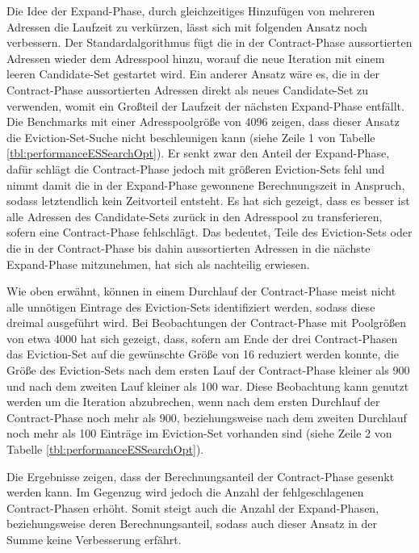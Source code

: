 Die Idee der Expand-Phase, durch gleichzeitiges Hinzufügen von mehreren Adressen die Laufzeit zu verkürzen, lässt sich mit folgenden Ansatz noch verbessern.
Der Standardalgorithmus fügt die in der Contract-Phase aussortierten Adressen wieder dem Adresspool hinzu, worauf die neue Iteration mit einem leeren Candidate-Set gestartet wird.
Ein anderer Ansatz wäre es, die in der Contract-Phase aussortierten Adressen direkt als neues Candidate-Set zu verwenden, womit ein Großteil der Laufzeit der nächsten Expand-Phase entfällt.
Die Benchmarks mit einer Adresspoolgröße von 4096 zeigen, dass dieser Ansatz die Eviction-Set-Suche nicht beschleunigen kann (siehe Zeile 1 von Tabelle \ref{tbl:performanceESSearchOpt}).
Er senkt zwar den Anteil der Expand-Phase, dafür schlägt die Contract-Phase jedoch mit größeren Eviction-Sets fehl und nimmt damit die in der Expand-Phase gewonnene Berechnungszeit in Anspruch, sodass letztendlich kein Zeitvorteil entsteht.
Es hat sich gezeigt, dass es besser ist alle Adressen des Candidate-Sets zurück in den Adresspool zu transferieren, sofern eine Contract-Phase fehlschlägt.
Das bedeutet, Teile des Eviction-Sets oder die in der Contract-Phase bis dahin aussortierten Adressen in die nächste Expand-Phase mitzunehmen, hat sich als nachteilig erwiesen.


Wie oben erwähnt, können in einem Durchlauf der Contract-Phase meist nicht alle unnötigen Eintrage des Eviction-Sets identifiziert werden, sodass diese dreimal ausgeführt wird.
Bei Beobachtungen der Contract-Phase mit Poolgrößen von etwa 4000 hat sich gezeigt, dass, sofern am Ende der drei Contract-Phasen das Eviction-Set auf die gewünschte Größe von 16 reduziert werden konnte, die Größe des Eviction-Sets nach dem ersten Lauf der Contract-Phase kleiner als 900 und nach dem zweiten Lauf kleiner als 100 war.
Diese Beobachtung kann genutzt werden um die Iteration abzubrechen, wenn nach dem ersten Durchlauf der Contract-Phase noch mehr als 900, beziehungsweise nach dem zweiten Durchlauf noch mehr als 100 Einträge im Eviction-Set vorhanden sind (siehe Zeile 2 von Tabelle \ref{tbl:performanceESSearchOpt}).

Die Ergebnisse zeigen, dass der Berechnungsanteil der Contract-Phase gesenkt werden kann. Im Gegenzug wird jedoch die Anzahl der fehlgeschlagenen Contract-Phasen erhöht.
Somit steigt auch die Anzahl der Expand-Phasen, beziehungsweise deren Berechnungsanteil, sodass auch dieser Ansatz in der Summe keine Verbesserung erfährt.


